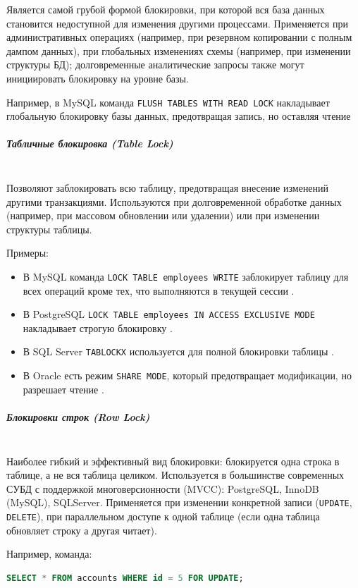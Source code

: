 Является самой грубой формой блокировки, при которой вся база данных становится недоступной для изменения другими процессами. Применяется при административных операциях (например, при резервном копировании с полным дампом данных), при глобальных изменениях схемы (например, при изменении структуры БД); долговременные аналитические запросы также могут инициировать блокировку на уровне базы.
 
 Например, в MySQL команда \texttt{FLUSH TABLES WITH READ LOCK} накладывает глобальную блокировку базы данных, предотвращая запись, но оставляя чтение \autocite[§15.7.8.3]{Mysqldoc5}
 
 \subparagraph{Табличные блокировка (Table Lock)} ~\\

 Позволяют заблокировать всю таблицу, предотвращая внесение изменений другими транзакциями. Используются при долговременной обработке данных (например, при массовом обновлении или удалении) или при изменении структуры таблицы.
 
 Примеры:
 \begin{itemize}
     \item В MySQL команда \texttt{LOCK TABLE employees WRITE} заблокирует таблицу для всех операций кроме тех, что выполняются в текущей сессии \autocite[§15.3.6]{Mysqldoc5}.
     \item В PostgreSQL \texttt{LOCK TABLE employees IN ACCESS EXCLUSIVE MODE} накладывает строгую блокировку \autocite{PgReference1}.
     \item В SQL Server \texttt{TABLOCKX} используется для полной блокировки таблицы \autocite{MicrosoftLearnSQLserverTabHints}.
     \item В Oracle есть режим \texttt{SHARE MODE}, который предотвращает модификации, но разрешает чтение \autocite[ch.18]{oracledbreference}.
 \end{itemize}
 
 \subparagraph{Блокировки строк (Row Lock)} ~\\

 Наиболее гибкий и эффективный вид блокировки: блокируется одна строка в таблице, а не вся таблица целиком. Используется в большинстве современных СУБД с поддержкой многоверсионности (MVCC): PostgreSQL, InnoDB (MySQL), SQLServer.
 Применяется при изменении конкретной записи (\texttt{UPDATE}, \texttt{DELETE}), при параллельном доступе к одной таблице (если одна таблица обновляет строку а другая читает).
 
 Например, команда:
 \begin{lstlisting}[language=SQL]
     SELECT * FROM accounts WHERE id = 5 FOR UPDATE;
 \end{lstlisting}

